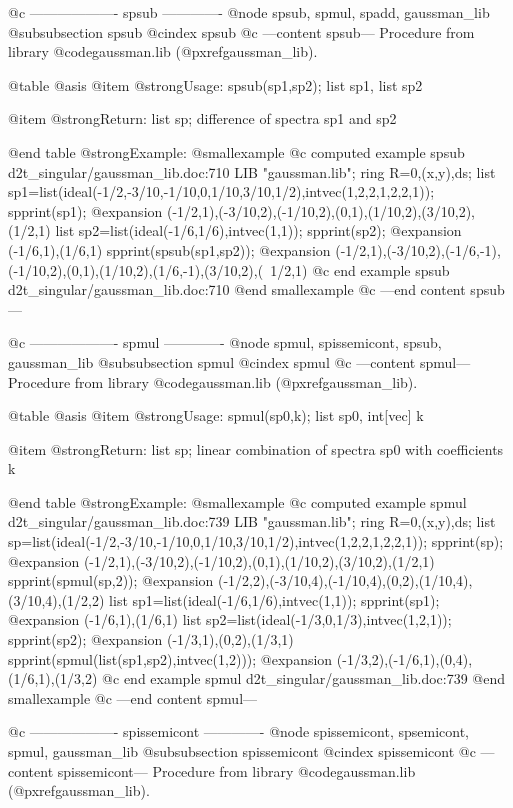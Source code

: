 @c ------------------- spsub -------------
@node spsub, spmul, spadd, gaussman_lib
@subsubsection spsub
@cindex spsub
@c ---content spsub---
Procedure from library @code{gaussman.lib} (@pxref{gaussman_lib}).

@table @asis
@item @strong{Usage:}
spsub(sp1,sp2); list sp1, list sp2

@item @strong{Return:}
list sp; difference of spectra sp1 and sp2

@end table
@strong{Example:}
@smallexample
@c computed example spsub d2t_singular/gaussman_lib.doc:710 
LIB "gaussman.lib";
ring R=0,(x,y),ds;
list sp1=list(ideal(-1/2,-3/10,-1/10,0,1/10,3/10,1/2),intvec(1,2,2,1,2,2,1));
spprint(sp1);
@expansion{} (-1/2,1),(-3/10,2),(-1/10,2),(0,1),(1/10,2),(3/10,2),(1/2,1)
list sp2=list(ideal(-1/6,1/6),intvec(1,1));
spprint(sp2);
@expansion{} (-1/6,1),(1/6,1)
spprint(spsub(sp1,sp2));
@expansion{} (-1/2,1),(-3/10,2),(-1/6,-1),(-1/10,2),(0,1),(1/10,2),(1/6,-1),(3/10,2),(\
   1/2,1)
@c end example spsub d2t_singular/gaussman_lib.doc:710
@end smallexample
@c ---end content spsub---

@c ------------------- spmul -------------
@node spmul, spissemicont, spsub, gaussman_lib
@subsubsection spmul
@cindex spmul
@c ---content spmul---
Procedure from library @code{gaussman.lib} (@pxref{gaussman_lib}).

@table @asis
@item @strong{Usage:}
spmul(sp0,k); list sp0, int[vec] k

@item @strong{Return:}
list sp; linear combination of spectra sp0 with coefficients k

@end table
@strong{Example:}
@smallexample
@c computed example spmul d2t_singular/gaussman_lib.doc:739 
LIB "gaussman.lib";
ring R=0,(x,y),ds;
list sp=list(ideal(-1/2,-3/10,-1/10,0,1/10,3/10,1/2),intvec(1,2,2,1,2,2,1));
spprint(sp);
@expansion{} (-1/2,1),(-3/10,2),(-1/10,2),(0,1),(1/10,2),(3/10,2),(1/2,1)
spprint(spmul(sp,2));
@expansion{} (-1/2,2),(-3/10,4),(-1/10,4),(0,2),(1/10,4),(3/10,4),(1/2,2)
list sp1=list(ideal(-1/6,1/6),intvec(1,1));
spprint(sp1);
@expansion{} (-1/6,1),(1/6,1)
list sp2=list(ideal(-1/3,0,1/3),intvec(1,2,1));
spprint(sp2);
@expansion{} (-1/3,1),(0,2),(1/3,1)
spprint(spmul(list(sp1,sp2),intvec(1,2)));
@expansion{} (-1/3,2),(-1/6,1),(0,4),(1/6,1),(1/3,2)
@c end example spmul d2t_singular/gaussman_lib.doc:739
@end smallexample
@c ---end content spmul---

@c ------------------- spissemicont -------------
@node spissemicont, spsemicont, spmul, gaussman_lib
@subsubsection spissemicont
@cindex spissemicont
@c ---content spissemicont---
Procedure from library @code{gaussman.lib} (@pxref{gaussman_lib}).

